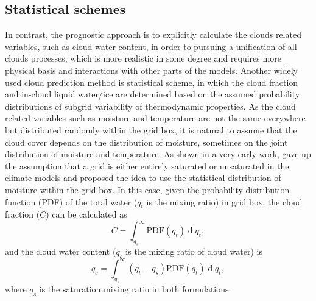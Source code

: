 \subsection{Statistical schemes}
\label{sec:PDF_cld_scheme}

In contrast, the prognostic approach \citep[e.g.,][]{Tiedtke1993} is to explicitly calculate the clouds related variables, such as cloud water content, in order to pursuing a unification of all clouds processes, which is more realistic in some degree and requires more physical basis and interactions with other parts of the models. Another widely used cloud prediction method is statistical scheme, in which the cloud fraction and in-cloud liquid water/ice are determined based on the assumed probability distributions of subgrid variability of thermodynamic properties. As the cloud related variables such as moisture and temperature are not the same everywhere but distributed randomly within the grid box, it is natural to assume that the cloud cover depends on the distribution of moisture, sometimes on the joint distribution of moisture and temperature. As shown in a very early work, \cite{Sommeria1977} gave up the assumption that a grid is either entirely saturated or unsaturated in the climate models and proposed the idea to use the statistical distribution of moisture within the grid box. In this case, given the probability distribution function (PDF) of the total water ($q_t$ is the mixing ratio) in grid box, the cloud fraction ($C$) can be calculated as 
\begin{equation}
    C=\int_{q_s}^{\infty}\mathrm{PDF}(q_t)\operatorname{d}q_t,
\end{equation}
and the cloud water content ($q_c$ is the mixing ratio of cloud water) is
\begin{equation}
    q_c=\int_{q_s}^{\infty}(q_t-q_s)\mathrm{PDF}(q_t)\operatorname{d}q_t,
\end{equation}
where $q_s$ is the saturation mixing ratio in both formulations.

